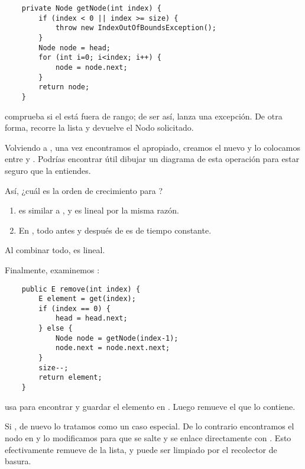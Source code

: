 \documentclass[12pt]{book}
\theoremstyle{exercise}
\begin{document}

\begin{verbatim}
    private Node getNode(int index) {
        if (index < 0 || index >= size) {
            throw new IndexOutOfBoundsException();
        }
        Node node = head;
        for (int i=0; i<index; i++) {
            node = node.next;
        }
        return node;
    }
\end{verbatim}

 comprueba si el  está fuera de rango; de ser así,
lanza una excepción. De otra forma, recorre la lista y devuelve el Nodo solicitado.


Volviendo a , una vez encontramos el  apropiado, creamos el
nuevo  y lo colocamos entre  y . Podrías
encontrar útil dibujar un diagrama de esta operación para estar seguro que la
entiendes.

Así, ¿cuál es la orden de crecimiento para ?

\begin{enumerate}

\item
   es similar a
  , y es lineal por la misma razón.

\item
  En , todo antes y después de  es
  de tiempo constante.

\end{enumerate}

Al combinar todo,  es lineal.


Finalmente, examinemos :

\begin{verbatim}
    public E remove(int index) {
        E element = get(index);
        if (index == 0) {
            head = head.next;
        } else {
            Node node = getNode(index-1);
            node.next = node.next.next;
        }
        size--;
        return element;
    }
\end{verbatim}

 usa  para encontrar y guardar el elemento en
. Luego remueve el  que lo contiene.

Si , de nuevo lo tratamos como un caso especial. De lo contrario
encontramos el nodo en  y lo modificamos para que se salte
 y se enlace directamente con . Esto
efectivamente remueve  de la lista, y puede ser limpiado
por el recolector de basura.
\end{document}
